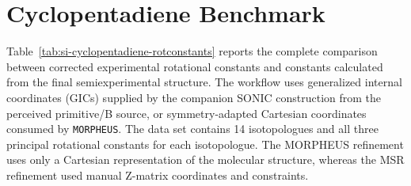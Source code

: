 \documentclass[12pt]{article}
\begin{document}
\section{Cyclopentadiene Benchmark}

Table~\ref{tab:si-cyclopentadiene-rotconstants} reports the complete
comparison between corrected experimental rotational constants and constants
calculated from the final semiexperimental structure. The workflow uses
generalized internal coordinates (GICs) supplied by the companion SONIC
construction from the perceived primitive/B source, or symmetry-adapted Cartesian coordinates consumed by
\texttt{MORPHEUS}. The data set contains 14
isotopologues and all three principal rotational constants for each
isotopologue. The MORPHEUS refinement uses only a Cartesian representation of the
molecular structure, whereas the MSR refinement used manual Z-matrix
coordinates and constraints.
\end{document}
